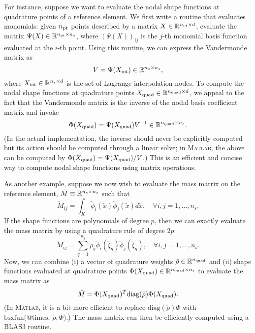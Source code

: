 For instance, suppose we want to evaluate the nodal shape functions at quadrature points of a reference element.  We first write a routine that evaluates monomials: given $n_{\rm pt}$ points described by a matrix $X \in \mathbb{R}^{n_{\rm pt} \times d}$, evaluate the matrix $\Psi(X) \in \mathbb{R}^{n_{\rm pt} \times n_s}$, where $(\Psi(X))_{ij}$ is the $j$-th monomial basis function evaluated at the $i$-th point. Using this routine, we can express the Vandermonde matrix as
\begin{equation*}
  V = \Psi(X_{\rm int}) \in \mathbb{R}^{n_s \times n_s},
\end{equation*}
where $X_{\rm int} \in \mathbb{R}^{n_s \times d}$ is the set of Lagrange interpolation nodes.  To compute the nodal shape functions at quadrature points $X_{\rm quad} \in \mathbb{R}^{n_{\rm quad} \times d}$, we appeal to the fact that the Vandermonde matrix is the inverse of the nodal basis coefficient matrix and invoke
\begin{equation*}
  \Phi(X_{\rm quad}) = \Psi(X_{\rm quad}) V^{-1} \in \mathbb{R}^{n_{\rm quad} \times n_s}.
\end{equation*}
(In the actual implementation, the inverse should never be explicitly computed but its action should be computed through a linear solve; in \textsc{Matlab}, the above can be computed by $\Phi(X_{\rm quad}) = \Psi(X_{\rm quad}) / V$.)  This is an efficient and concise way to compute nodal shape functions using matrix operations.

As another example, suppose we now wish to evaluate the mass matrix on the reference element, $\tilde M \equiv \mathbb{R}^{n_s \times n_s}$ such that
\begin{equation*}
  \tilde M_{ij} = \int_{\tilde K} \tilde \phi_i(\tilde x) \tilde \phi_j(\tilde x) d \tilde x, \quad \forall i,j = 1,\dots,n_s.
\end{equation*}
If the shape functions are polynomials of degree $p$, then we can exactly evaluate the mass matrix by using a quadrature rule of degree $2p$:
\begin{equation*}
  \tilde M_{ij} = \sum_{q=1}^{n_{q}} \tilde \rho_q \tilde \phi_i(\tilde \xi_q) \tilde \phi_j(\tilde \xi_q), \quad \forall i,j = 1,\dots,n_s.
\end{equation*}
Now, we can combine (i) a vector of quadrature weights $\tilde \rho \in \mathbb{R}^{n_{\rm quad}}$ and (ii) shape functions evaluated at quadrature points $\Phi(X_{\rm quad}) \in \mathbb{R}^{n_{\rm quad} \times n_s}$ to evaluate the mass matrix as
\begin{equation*}
  \tilde M = \Phi(X_{\rm quad})^T \text{diag}(\tilde \rho) \Phi(X_{\rm quad}).
\end{equation*}
(In \textsc{Matlab}, it is a bit more efficient to replace $\text{diag}( \tilde \rho ) \Phi$ with $\text{bsxfun(@times, } \tilde \rho,\Phi)$.) The mass matrix can then be efficiently computed using a BLAS3 routine.

